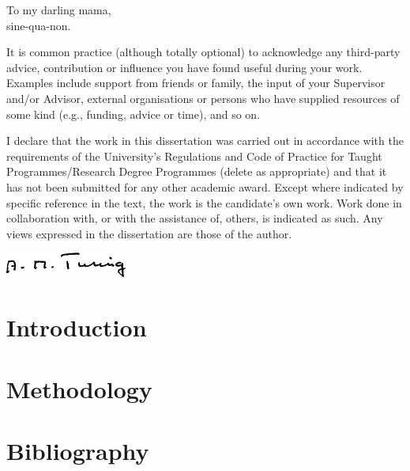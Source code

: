 \documentclass[
  ieee        %
]{uob-thesis}
\begin{document}
\begin{dedication}
  To my darling mama,\\
  sine-qua-non.
\end{dedication}

\begin{acknowledgements}
It is common practice (although totally optional) to acknowledge any third-party
advice, contribution or influence you have found useful during your work.
Examples include support from friends or family, the input of your Supervisor
and/or Advisor, external organisations or persons who  have supplied resources
of some kind (e.g., funding, advice or time), and so on.
\end{acknowledgements}

\begin{declaration}
  I declare that the work in this dissertation was carried out in accordance
  with the requirements of the University's Regulations and Code of Practice for
  Taught Programmes/Research Degree Programmes {\color{red} (delete as
  appropriate)} and that it has not been submitted for any other academic award.
  Except where indicated by specific reference in the text, the work is the
  candidate's own work. Work done in collaboration with, or with the assistance
  of, others, is indicated as such. Any views expressed in the
  dissertation are those of the author.
  
  \vspace{2cm}

  \includegraphics[width=4cm]{sig}
\end{declaration}




\frontmatter

\tableofcontents
\listoftables
\listoffigures



\mainmatter

\chapter{Introduction}

  

\chapter{Methodology}

  



\backmatter

\chapter*{Bibliography}

\printbibliography[heading=none]
\end{document}
